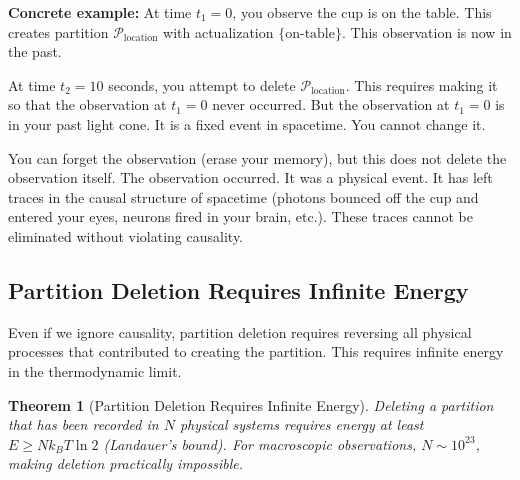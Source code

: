 \documentclass[twocolumn,10pt]{article}
\newtheorem{theorem}{Theorem}[section]
\theoremstyle{definition}
\theoremstyle{remark}
\begin{document}
\noindent\textbf{Concrete example:} At time $t_1 = 0$, you observe the cup is on the table. This creates partition $\mathcal{P}_{\text{location}}$ with actualization $\{\text{on-table}\}$. This observation is now in the past.

At time $t_2 = 10$ seconds, you attempt to delete $\mathcal{P}_{\text{location}}$. This requires making it so that the observation at $t_1 = 0$ never occurred. But the observation at $t_1 = 0$ is in your past light cone. It is a fixed event in spacetime. You cannot change it.

\vspace{0.2cm}
\noindent You can forget the observation (erase your memory), but this does not delete the observation itself. The observation occurred. It was a physical event. It has left traces in the causal structure of spacetime (photons bounced off the cup and entered your eyes, neurons fired in your brain, etc.). These traces cannot be eliminated without violating causality.

\subsection{Partition Deletion Requires Infinite Energy}

Even if we ignore causality, partition deletion requires reversing all physical processes that contributed to creating the partition. This requires infinite energy in the thermodynamic limit.

\begin{theorem}[Partition Deletion Requires Infinite Energy]
\label{thm:deletion_energy}
Deleting a partition that has been recorded in $N$ physical systems requires energy at least $E \geq N k_B T \ln 2$ (Landauer's bound). For macroscopic observations, $N \sim 10^{23}$, making deletion practically impossible.
\end{theorem}
\end{document}
